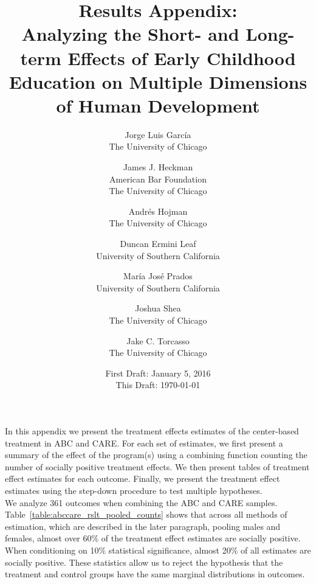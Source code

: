 



\title{\Large \textbf{Results Appendix: \\ Analyzing the Short- and Long-term Effects of Early Childhood Education on Multiple Dimensions of Human Development}}

\author{
Jorge Luis Garc\'{i}a\\
The University of Chicago \and
James J. Heckman \\
American Bar Foundation \\
The University of Chicago \and
Andr\'{e}s Hojman\\
The University of Chicago \and
Duncan Ermini Leaf \\ 
University of Southern California \and
Mar\'{i}a Jos\'{e} Prados \\
University of Southern California \and
Joshua Shea \\
The University of Chicago \and 
Jake C. Torcasso \\
The University of Chicago}
\date{First Draft: January 5, 2016\\ This Draft: \today}
\maketitle
\thispagestyle{empty}

\tableofcontents
\listoftables
\pagebreak
\doublespacing
{}

\noindent In this appendix we present the treatment effects estimates of the center-based treatment in ABC and CARE. For each set of estimates, we first present a summary of the effect of the program(s) using a combining function counting the number of socially positive treatment effects. We then present tables of treatment effect estimates for each outcome. Finally, we present the treatment effect estimates using the step-down procedure to test multiple hypotheses. \\

\noindent We analyze 361 outcomes when combining the ABC and CARE samples. Table~\ref{table:abccare_rslt_pooled_counts} shows that across all methods of estimation, which are described in the later paragraph, pooling males and females, almost over 60\% of the treatment effect estimates are socially positive. When conditioning on 10\% statistical significance, almost 20\% of all estimates are socially positive. These statistics allow us to reject the hypothesis that the treatment and control groups have the same marginal distributions in outcomes. \\

